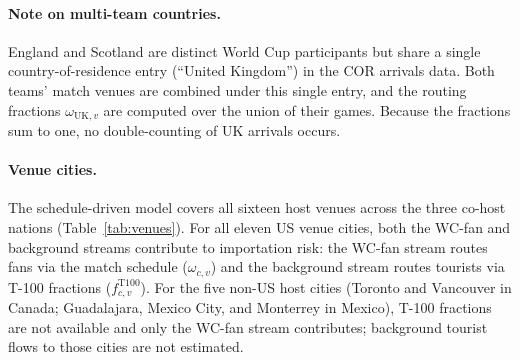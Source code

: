 \documentclass[12pt]{article}
\begin{document}
\paragraph{Note on multi-team countries.}
England and Scotland are distinct World Cup participants but share a
single country-of-residence entry (``United Kingdom'') in the COR
arrivals data. Both teams' match venues are combined under this single
entry, and the routing fractions $\omega_{\text{UK},v}$ are computed
over the union of their games. Because the fractions sum to one, no
double-counting of UK arrivals occurs.

\paragraph{Venue cities.}
The schedule-driven model covers all sixteen host venues across the
three co-host nations (Table~\ref{tab:venues}). For all eleven US
venue cities, both the WC-fan and background streams contribute to
importation risk: the WC-fan stream routes fans via the match
schedule ($\omega_{c,v}$) and the background stream routes tourists
via T-100 fractions ($f_{c,v}^{\text{T100}}$). For the five
non-US host cities (Toronto and Vancouver in Canada; Guadalajara,
Mexico City, and Monterrey in Mexico), T-100 fractions are not
available and only the WC-fan stream contributes; background tourist
flows to those cities are not estimated.
\end{document}
